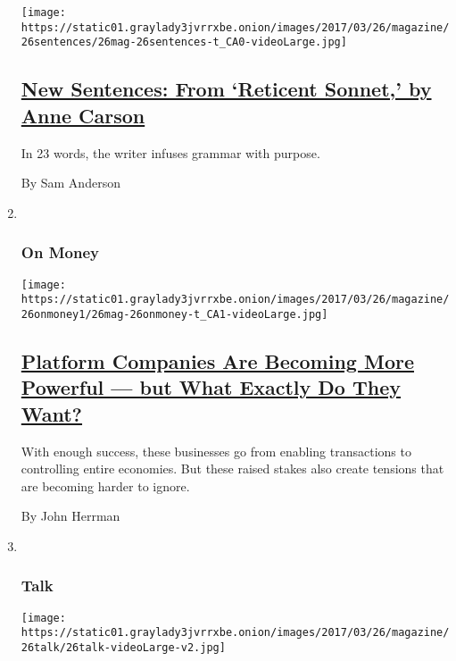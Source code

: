 \begin{enumerate}
  \texttt{[image: https://static01.graylady3jvrrxbe.onion/images/2017/03/26/magazine/26sentences/26mag-26sentences-t\_CA0-videoLarge.jpg]}

  \hypertarget{new-sentences-from-reticent-sonnet-by-anne-carson}{%
  \subsection{\texorpdfstring{\href{/2017/03/21/magazine/new-sentences-from-reticent-sonnet-by-anne-carson.html}{New
  Sentences: From `Reticent Sonnet,' by Anne
  Carson}}{New Sentences: From `Reticent Sonnet,' by Anne Carson}}\label{new-sentences-from-reticent-sonnet-by-anne-carson}}

  In 23 words, the writer infuses grammar with purpose.

  By Sam Anderson
\item ~
  \hypertarget{on-money}{%
  \subsubsection{On Money}\label{on-money}}

  \texttt{[image: https://static01.graylady3jvrrxbe.onion/images/2017/03/26/magazine/26onmoney1/26mag-26onmoney-t\_CA1-videoLarge.jpg]}

  \hypertarget{platform-companies-are-becoming-more-powerful--but-what-exactly-do-they-want}{%
  \subsection{\texorpdfstring{\href{/2017/03/21/magazine/platform-companies-are-becoming-more-powerful-but-what-exactly-do-they-want.html}{Platform
  Companies Are Becoming More Powerful --- but What Exactly Do They
  Want?}}{Platform Companies Are Becoming More Powerful --- but What Exactly Do They Want?}}\label{platform-companies-are-becoming-more-powerful--but-what-exactly-do-they-want}}

  With enough success, these businesses go from enabling transactions to
  controlling entire economies. But these raised stakes also create
  tensions that are becoming harder to ignore.

  By John Herrman
\item ~
  \hypertarget{talk}{%
  \subsubsection{Talk}\label{talk}}

  \texttt{[image: https://static01.graylady3jvrrxbe.onion/images/2017/03/26/magazine/26talk/26talk-videoLarge-v2.jpg]}


\end{enumerate}
